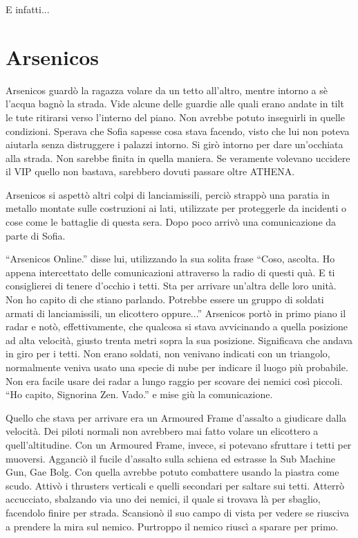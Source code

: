     E infatti...

  \section*{Arsenicos}

    Arsenicos guardò la ragazza volare da un tetto all'altro, mentre intorno a sè l'acqua bagnò la strada. Vide alcune
    delle guardie alle quali erano andate in tilt le tute ritirarsi verso l'interno del piano. Non avrebbe potuto
    inseguirli in quelle condizioni. Sperava che Sofia sapesse cosa stava facendo, visto che lui non poteva aiutarla
    senza distruggere i palazzi intorno. Si girò intorno per dare un'occhiata alla strada. Non sarebbe finita in quella
    maniera. Se veramente volevano uccidere il VIP quello non bastava, sarebbero dovuti passare oltre ATHENA.

    Arsenicos si aspettò altri colpi di lanciamissili, perciò strappò una paratia in metallo montate sulle costruzioni
    ai lati, utilizzate per proteggerle da incidenti o cose come le battaglie di questa sera. Dopo poco arrivò una
    comunicazione da parte di Sofia.

    ``Arsenicos Online.'' disse lui, utilizzando la sua solita frase ``Coso, ascolta. Ho appena intercettato delle
    comunicazioni attraverso la radio di questi quà. E ti consiglierei di tenere d'occhio i tetti. Sta per arrivare
    un'altra delle loro unità. Non ho capito di che stiano parlando. Potrebbe essere un gruppo di soldati armati di
    lanciamissili, un elicottero oppure...'' Arsenicos portò in primo piano il radar e notò, effettivamente, che
    qualcosa si stava avvicinando a quella posizione ad alta velocità, giusto trenta metri sopra la sua posizione.
    Significava che andava in giro per i tetti. Non erano soldati, non venivano indicati con un triangolo, normalmente
    veniva usato una specie di nube per indicare il luogo più probabile. Non era facile usare dei radar a lungo raggio
    per scovare dei nemici così piccoli. ``Ho capito, Signorina Zen. Vado.'' e mise giù la comunicazione.

    Quello che stava per arrivare era un Armoured Frame d'assalto a giudicare dalla velocità. Dei piloti normali non
    avrebbero mai fatto volare un elicottero a quell'altitudine. Con un Armoured Frame, invece, si potevano sfruttare i
    tetti per muoversi. Agganciò il fucile d'assalto sulla schiena ed estrasse la Sub Machine Gun, Gae Bolg. Con quella
    avrebbe potuto combattere usando la piastra come scudo. Attivò i thrusters verticali e quelli secondari per saltare
    sui tetti. Atterrò accucciato, sbalzando via uno dei nemici, il quale si trovava là per sbaglio, facendolo finire
    per strada. Scansionò il suo campo di vista per vedere se riusciva a prendere la mira sul nemico. Purtroppo il
    nemico riuscì a sparare per primo.

